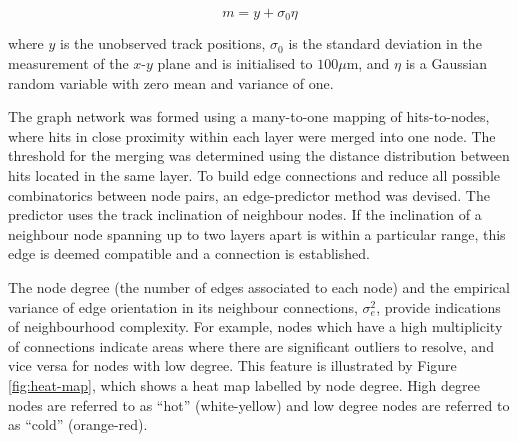 \begin{equation}
m = y + \sigma_0 \eta
\label{eqn:mc-toy-measurement-model}
\end{equation}

where $y$ is the unobserved track positions, $\sigma_0$ is the standard deviation in the measurement of the $x$-$y$ plane and is initialised to $100 \mu $m, and $\eta$ is a Gaussian random variable with zero mean and variance of one.

The graph network was formed using a many-to-one mapping of hits-to-nodes, where hits in close proximity within each layer were merged into one node. The threshold for the merging was determined using the distance distribution between hits located in the same layer. To build edge connections and reduce all possible combinatorics between node pairs, an edge-predictor method was devised. The predictor uses the track inclination of neighbour nodes. If the inclination of a neighbour node spanning up to two layers apart is within a particular range, this edge is deemed compatible and a connection is established. 

The node degree (the number of edges associated to each node) and the empirical variance of edge orientation in its neighbour connections, $\sigma_{e}^{2}$, provide indications of neighbourhood complexity. For example, nodes which have a high multiplicity of connections indicate areas where there are significant outliers to resolve, and vice versa for nodes with low degree. This feature is illustrated by Figure \ref{fig:heat-map}, which shows a heat map labelled by node degree. High degree nodes are referred to as ``hot'' (white-yellow) and low degree nodes are referred to as ``cold'' (orange-red).


